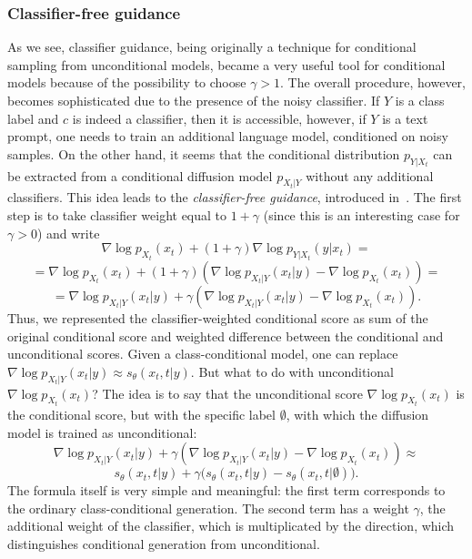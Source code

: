 \subsubsection{Classifier-free guidance}
As we see, classifier guidance, being originally a technique for conditional sampling from unconditional models, became a very useful tool for conditional models because of the possibility to choose $\gamma > 1$. The overall procedure, however, becomes sophisticated due to the presence of the noisy classifier. If $Y$ is a class label and $c$ is indeed a classifier, then it is accessible, however, if $Y$ is a text prompt, one needs to train an additional language model, conditioned on noisy samples. On the other hand, it seems that the conditional distribution $p_{Y | X_t}$ can be extracted from a conditional diffusion model $p_{X_t | Y}$ without any additional classifiers. This idea leads to the \emph{classifier-free guidance}, introduced in~\cite{ho2022classifier}. The first step is to take classifier weight equal to $1 + \gamma$ (since this is an interesting case for $\gamma > 0$) and write
\[
    \nabla \log p_{X_t}(x_t) + (1 + \gamma) \nabla \log p_{Y | X_t}(y | x_t) =
\]
\[
    = \nabla \log p_{X_t}(x_t) + (1 + \gamma)(\nabla \log p_{X_t | Y}(x_t | y) - \nabla \log p_{X_t}(x_t)) =
\]
\[
    = \nabla \log p_{X_t | Y}(x_t | y) + \gamma (\nabla \log p_{X_t | Y}(x_t | y) - \nabla \log p_{X_t}(x_t)).
\]
Thus, we represented the classifier-weighted conditional score as sum of the original conditional score and weighted difference between the conditional and unconditional scores. Given a class-conditional model, one can replace $\nabla \log p_{X_t | Y}(x_t | y) \approx s_\theta(x_t, t |y)$. But what to do with unconditional $\nabla \log p_{X_t}(x_t)$? The idea is to say that the unconditional score $\nabla \log p_{X_t}(x_t)$ is the conditional score, but with the specific label $\emptyset$, with which the diffusion model is trained as unconditional:
\[
    \nabla \log p_{X_t | Y}(x_t | y) + \gamma (\nabla \log p_{X_t | Y}(x_t | y) - \nabla \log p_{X_t}(x_t)) \approx
\]
\[
    s_\theta(x_t, t | y) + \gamma\big (s_\theta(x_t, t | y) - s_\theta(x_t, t | \emptyset)\big).
\]
The formula itself is very simple and meaningful: the first term corresponds to the ordinary class-conditional generation. The second term has a weight $\gamma$, the additional weight of the classifier, which is multiplicated by the direction, which distinguishes conditional generation from unconditional.

